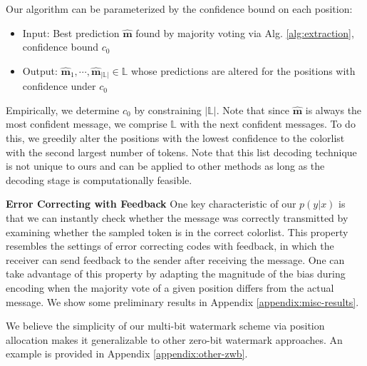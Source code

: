 Our algorithm can be parameterized by the confidence bound on each position:
\vspace{-1mm}
{\setlength{\leftmargini}{.5cm}   
\begin{itemize}
    \item Input: Best prediction $\hat{\mathbf{m}}$ found by majority voting via Alg. \ref{alg:extraction}, confidence bound $c_0$ 
    \vspace{-1mm}
    \item Output: $\hat{\mathbf{m}}_1,\cdots, \hat{\mathbf{m}}_{|\mathbb{L}|} \in \mathbb{L}$ whose predictions are altered for the positions with confidence under $c_0$ 
    \end{itemize}
}

Empirically, we determine $c_0$ by constraining $|\mathbb{L}|$. Note that since $\hat{\textbf{m}}$ is always the most confident message, we comprise $\mathbb{L}$ with the next confident messages. To do this, we greedily alter the positions with the lowest confidence to the colorlist with the second largest number of tokens. Note that this list decoding technique is not unique to ours and can be applied to other methods as long as the decoding stage is computationally feasible.

\noindent \textbf{Error Correcting with Feedback}
One key characteristic of our $p(y|x)$ is that we can instantly check whether the message was correctly transmitted by examining whether the sampled token is in the correct colorlist. This property resembles the settings of error correcting codes with feedback, in which the receiver can send feedback to the sender after receiving the message\citep{berlekamp1964block, gupta2023binary}. One can take advantage of this property by adapting the magnitude of the bias during encoding when the majority vote of a given position differs from the actual message. We show some preliminary results in Appendix \ref{appendix:misc-results}.  

We believe the simplicity of our multi-bit watermark scheme via position allocation makes it generalizable to other zero-bit watermark approaches. An example is provided in Appendix \ref{appendix:other-zwb}.


